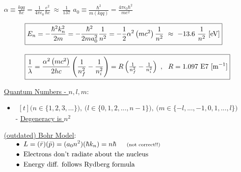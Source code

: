\documentclass[12pt]{article}
\begin{document}
\vspace{25pt} \noindent
\( \boxed{ \alpha \equiv \frac{kqq}{\hbar c} 
    = \frac{1}{4 \pi \epsilon_0} \frac{e^2}{\hbar c} \ \approx \ \frac{1}{137} } \)
\hspace{1cm}
\( \boxed{ a_0 \equiv \frac{\hbar^2}{m (kqq)} = \frac{4 \pi \epsilon_0 \hbar^2}{m e^2} } \)

\begin{align*}
    \Aboxed{ &E_n = - \frac{\hbar^2 k_n^2}{2m} = - \frac{\hbar^2}{2m a_0^2} \frac{1}{n^2}
        = - \frac{1}{2} \alpha^2 \left( m c^2 \right) \dfrac{1}{n^2}
        \ \approx \ -13.6 \ \dfrac{1}{n^2} \ [\text{eV}] }\\[10pt]
    \Aboxed{ &\frac{1}{\lambda} = \frac{\alpha^2 \left( m c^2 \right) }{2 h c}
        \left( \dfrac{1}{n_f^2} - \dfrac{1}{n_i^2} \right)
        = R \left( \tfrac{1}{n_f^2} - \tfrac{1}{n_i^2} \right) 
        \ , \ \ R = 1.097 \ \text{E} 7 \ [\text{m}^{-1}] }
\end{align*}

\vspace{20pt} \noindent
\underline{Quantum Numbers - \(n,l,m\)}:
\begin{itemize}
\item \( \begin{gathered}[t]
        \Big( n \in \{ 1, 2, 3, ... \} \Big), \ 
        \Big( l \in \{ 0, 1, 2, ..., n-1 \} \Big), \
        \Big( m \in \{ -l, ..., -1, 0, 1, ..., l \} \Big)
    \end{gathered} \)\\[10pt]
    - \underline{Degeneracy is \(n^2\)}
\end{itemize}      

\vspace{10pt}\noindent
\underline{(outdated) Bohr Model}:\\[10pt]
\(\begin{aligned}
    \indent &\bullet \ L = ( \bar{r} ) ( \bar{p} ) = (a_0 n^2) (\hbar k_n) 
        = n\hbar \indent \text{\scriptsize(not correct!!)}\\
    \indent &\bullet \ \text{Electrons don't radiate about the nucleus}\\
    \indent &\bullet \ \text{Energy diff. follows Rydberg formula}
\end{aligned}\)

\end{document}
